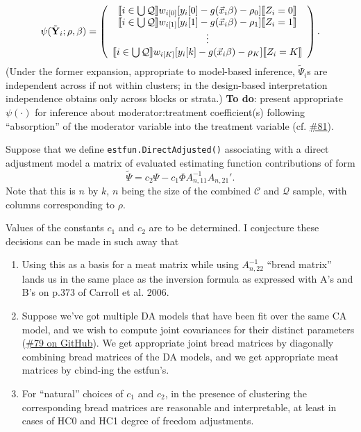 \documentclass{article}
\DeclarePairedDelimiter{\indicator}{\llbracket}{\rrbracket}
\newcommand{\owt}[1][z_i]{\ensuremath{w_{i[#1]}}}
\begin{document}
\begin{equation*}
           \psi(\tilde{\mathbf{Y}}_{i}; \rho, \beta) =
         \left( \begin{array}{c}
           \indicator{i \in \bigcup \mathcal{Q}}\owt[0][y_{i}[0] - g(\vec{x}_{i}\beta)-
                  \rho_{0}]\indicator{Z_{i}=0}\\
           \indicator{i \in \bigcup \mathcal{Q}}\owt[1][y_{i}[1] - g(\vec{x}_{i}\beta)-
                  \rho_{1}]\indicator{Z_{i}=1}\\
                  \vdots \\
           \indicator{i \in \bigcup \mathcal{Q}}\owt[K][y_{i}[k] - g(\vec{x}_{i}\beta)-
                  \rho_{K}]\indicator{Z_{i}=K}\\                  
                \end{array}\right).
\end{equation*}
(Under the former expansion, appropriate to model-based inference,
$\tilde{\Psi}_{i}$s are independent across if not within
clusters; in the design-based interpretation independence obtains only across blocks or
strata.)  \textbf{To do}: present appropriate $\psi(\cdot)$ for inference
about moderator:treatment coefficient(s) following ``absorption'' of the moderator
variable into the treatment variable (cf. \href{https://github.com/benbhansen-stats/flexida/issues/81#issuecomment-1282944562}{\#81}).
      
       Suppose that we define \texttt{estfun.DirectAdjusted()} associating
with a direct adjustment model a matrix of evaluated estimating function
contributions of form
\begin{equation*}
  \tilde{\Psi} = c_{2}\Psi - c_{1}\Phi A_{n,11}^{-1}A_{n,21}'.
\end{equation*}
Note that this is $n$ by
$k$, $n$ being the size of the combined $\mathcal{C}$ and
$\mathcal{Q}$ sample, with columns corresponding to $\rho$.

Values of the constants $c_{1}$ and $c_{2}$ are to be determined.
I conjecture these decisions can be made in such away that 
\begin{enumerate}
\item Using this as a basis for a meat matrix while using
  $A_{n,22}^{-1}$  ``bread matrix'' lands us in the same place as the
  inversion formula as expressed with A's and B's on p.373 of Carroll
  et al. 2006.
\item Suppose we've got multiple DA models that have been fit over the
  same CA model, and we wish to compute joint covariances for their
  distinct parameters
  (\href{https://github.com/benbhansen-stats/flexida/issues/79}{\#79
    on GitHub}). We get appropriate joint bread matrices by
  diagonally combining bread matrices of the DA models, and we get
  appropriate meat matrices by cbind-ing the estfun's.
\item For ``natural'' choices of $c_{1}$ and $c_{2}$, in the
  presence of clustering the corresponding bread matrices are
  reasonable and interpretable, at least in cases of HC0 and HC1
  degree of freedom adjustments. 
\end{enumerate}
\end{document}
